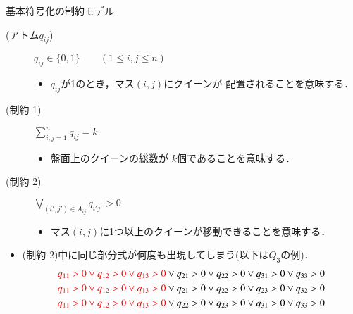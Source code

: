 \begin{frame}{基本符号化の制約モデル}
 \begin{block}{}
  \begin{description}
   \item[{\color{black} (アトム$q_{ij}$})] 
	      $q_{ij} \in \{0,1\} 
	      \qquad (1 \leq i,j \leq n)$ \par
	      \begin{itemize}
	       \item $q_{ij}$が1のとき，マス$(i,j)$にクイーンが
		     配置されることを意味する．
	      \end{itemize}
   \item[{\color{black}(制約 1)}] 
	      $\sum\limits_{i,j=1}^{n} q_{ij} = k$ \par
	      \begin{itemize}
	       \item 盤面上のクイーンの総数が
		     $k$個であることを意味する．
	      \end{itemize}
   \item[{\color{black}(制約 2)}] 
	      $\bigvee\limits_{(i',j') \in A_{ij}}q_{i'j'} > 0$ \par
	      \begin{itemize}
	       \item マス$(i,j)$に1つ以上のクイーンが移動できることを意味する．
	      \end{itemize}
	      
  \end{description}
 \end{block}
 \begin{alertblock}{}
  \begin{itemize}
   \item (制約 2)中に同じ部分式が何度も出現してしまう(以下は$Q_3$の例)．
   \begin{align*}
    {\color{red} q_{11}>0 \vee q_{12}>0 \vee q_{13}>0} 
    \vee q_{21}>0 \vee q_{22}>0 \vee q_{31}>0 \vee q_{33}>0 \\
    {\color{red} q_{11}>0 \vee q_{12}>0 \vee q_{13}>0} 
    \vee q_{21}>0 \vee q_{22}>0 \vee q_{23}>0 \vee q_{32}>0 \\
    {\color{red} q_{11}>0 \vee q_{12}>0 \vee q_{13}>0} 
    \vee q_{22}>0 \vee q_{23}>0 \vee q_{31}>0 \vee q_{33}>0 
   \end{align*}
  \end{itemize}
 \end{alertblock}
\end{frame}

